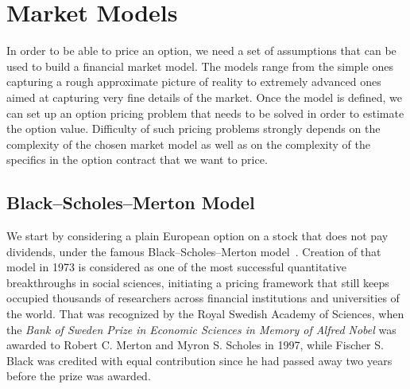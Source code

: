 \documentclass{UUThesisTemplate}
\begin{document}
%
\section{Market Models}
\label{sec:models}
\par
In order to be able to price an option, we need a set of assumptions that can be used to build a financial market model. The models range from the simple ones capturing a rough approximate picture of reality to extremely advanced ones aimed at capturing very fine details of the market. Once the model is defined, we can set up an option pricing problem that needs to be solved in order to estimate the option value. Difficulty of such pricing problems strongly depends on the complexity of the chosen market model as well as on the complexity of the specifics in the option contract that we want to price.  
%



%
\subsection{Black--Scholes--Merton Model}
\label{sub:bs}

\par
We start by considering a plain European option on a stock that does not pay dividends, under the famous Black--Scholes--Merton model~\cite{black73,merton73}. Creation of that model in 1973 is considered as one of the most successful quantitative breakthroughs in social sciences, initiating a pricing framework that still keeps occupied thousands of researchers across financial institutions and universities of the world. That was recognized by the Royal Swedish Academy of Sciences, when the \emph{Bank of Sweden Prize in Economic Sciences in Memory of Alfred Nobel} was awarded to Robert C. Merton and Myron S. Scholes in 1997, while Fischer S. Black was credited with equal contribution since he had passed away two years before the prize was awarded. 
\end{document}
